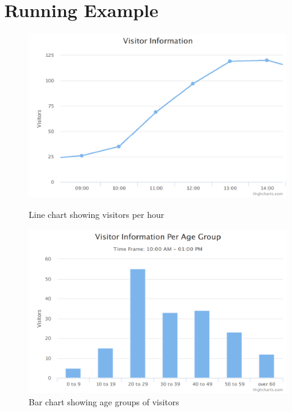\section{Running Example}


\begin{figure}[t]
  \centering
  \includegraphics[width=0.8\columnwidth]{figures/first-line.png}
  \caption{Line chart showing visitors per hour}
\label{figure:first-running-example:first-line-chart}
  \includegraphics[width=0.8\columnwidth]{figures/first-bar.png}
  \caption{Bar chart showing age groups of visitors}
  \vspace{-15pt}
  \label{figure:first-running-example:first-bar-chart}
  
\end{figure}

